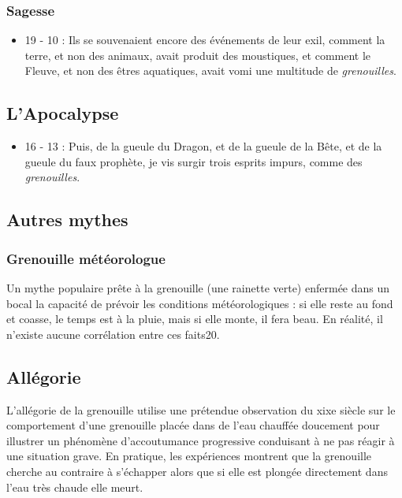 \subsubsection{Sagesse}
\begin{itemize}
\item 19 - 10 : Ils se souvenaient encore des événements de leur exil, comment la terre, et non des animaux, avait produit des moustiques, et comment le Fleuve, et non des êtres aquatiques, avait vomi une multitude de \textit{grenouilles}.
\end{itemize}
\subsection{L'Apocalypse}
\begin{itemize}
\item 16 - 13 : Puis, de la gueule du Dragon, et de la gueule de la Bête, et de la gueule du faux prophète, je vis surgir trois esprits impurs, comme des \textit{grenouilles}.
\end{itemize}
\subsection{Autres mythes}
\subsubsection{Grenouille météorologue}
Un mythe populaire prête à la grenouille (une rainette verte) enfermée dans un bocal la capacité de prévoir les conditions météorologiques : si elle reste au fond et coasse, le temps est à la pluie, mais si elle monte, il fera beau. En réalité, il n'existe aucune corrélation entre ces faits20.
\subsection{Allégorie}
L'allégorie de la grenouille utilise une prétendue observation du xixe siècle sur le comportement d'une grenouille placée dans de l'eau chauffée doucement pour illustrer un phénomène d'accoutumance progressive conduisant à ne pas réagir à une situation grave. 
En pratique, les expériences montrent que la grenouille cherche au contraire à s'échapper alors que si elle est plongée directement dans l'eau très chaude elle meurt.
